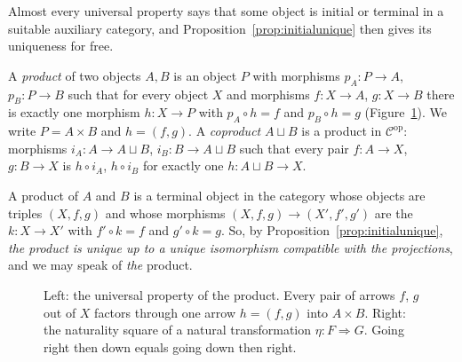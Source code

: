 Almost every universal property says that some object is initial or terminal in a suitable auxiliary category, and Proposition~\ref{prop:initialunique} then gives its uniqueness for free.

\begin{definition}\label{def:product}
A \emph{product} of two objects $A,B$ is an object $P$ with morphisms $p_A\colon P\to A$, $p_B\colon P\to B$ such that for every object $X$ and morphisms $f\colon X\to A$, $g\colon X\to B$ there is exactly one
morphism $h\colon X\to P$ with $p_A\circ h=f$ and $p_B\circ h=g$ (Figure~\ref{fig:universal}). We write $P=A\times B$ and $h=(f,g)$. A \emph{coproduct} $A\sqcup B$ is a product in $\mathcal C^{\mathrm{op}}$: morphisms
$i_A\colon A\to A\sqcup B$, $i_B\colon B\to A\sqcup B$ such that every pair $f\colon A\to X$, $g\colon B\to X$ is $h\circ i_A$, $h\circ i_B$ for exactly one $h\colon A\sqcup B\to X$.
\end{definition}

A product of $A$ and $B$ is a terminal object in the category whose objects are triples $(X,f,g)$ and whose morphisms $(X,f,g)\to(X',f',g')$ are the $k\colon X\to X'$ with $f'\circ k=f$ and $g'\circ k=g$. So, by
Proposition~\ref{prop:initialunique}, \emph{the product is unique up to a unique isomorphism compatible with the projections}, and we may speak of \emph{the} product.

\begin{figure}[ht]
\centering
{}
\caption{Left: the universal property of the product. Every pair of arrows $f$, $g$ out of $X$ factors through one arrow $h=(f,g)$ into $A\times B$. Right: the naturality square of a
natural transformation $\eta\colon F\Rightarrow G$. Going right then down equals going down then right.}
\label{fig:universal}
\end{figure}

